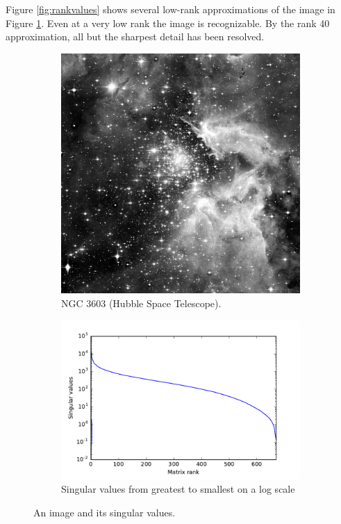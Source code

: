 Figure \ref{fig:rankvalues} shows several low-rank approximations of the image in Figure \ref{fig:hubble_original}.
Even at a very low rank the image is recognizable.
By the rank 40 approximation, all but the sharpest detail has been resolved.

\begin{figure}
\centering
\begin{subfigure}[b]{.49\textwidth}
\centering
\includegraphics[width=\textwidth*5/6]{hubble_red}
\caption{NGC 3603 (Hubble Space Telescope).}
\label{fig:hubble_original}
\end{subfigure}
\begin{subfigure}[b]{.49\textwidth}
\centering
\includegraphics[width=\textwidth*5/4]{hubble_svals}
\caption{Singular values from greatest to smallest on a log scale}
\label{fig:svals_plot}
\end{subfigure}
\caption{An image and its singular values.}
\label{fig:hubble}
\end{figure}


